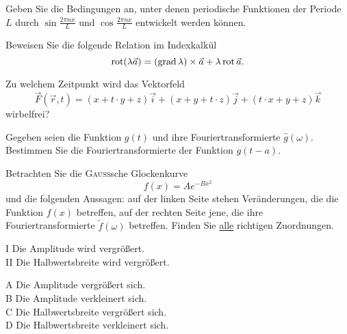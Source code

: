 \documentclass{atistandalonetask}
\begin{document}
\begin{atiTask}[
	title = Weitere Fragen
]
	\providecommand{\D}{\mathrm{d}}

\begin{atiSubtasks}
	\item Geben Sie die Bedingungen an, unter denen periodische Funktionen der Periode $L$ durch $\sin \frac{2\pi n x}{L}$ und $\cos \frac{2\pi nx}{L}$ entwickelt werden können.
	\item Beweisen Sie die folgende Relation im Indexkalkül
	\[\operatorname{rot}(\lambda\vec{a})=(\operatorname{grad}\lambda) \times\vec{a}+\lambda\operatorname{rot}\vec{a}.
	\]
	\item Zu welchem Zeitpunkt wird das Vektorfeld 
	\[
	\vec{F}(\vec{r},t)=(x+t\cdot y+z)\vec{i}+(x+y+t\cdot z)\vec{j}+(t\cdot x+y+z)\vec{k}
	\]
	wirbelfrei?
	\item Gegeben seien die Funktion $g(t)$ und ihre Fouriertransformierte $\hat{g}(\omega)$. Bestimmen Sie die Fouriertransformierte der Funktion $g(t-a)$.
	\item Betrachten Sie die \textsc{Gauss}sche Glockenkurve
	\[
	f(x)=Ae^{-Bx^2}
	\]
	und die folgenden Aussagen: auf der linken Seite stehen Veränderungen, die die Funktion $f(x)$ betreffen, auf der rechten Seite jene, die ihre Fouriertransformierte $\tilde{f}(\omega)$ betreffen. Finden Sie \underline{alle} richtigen Zuordnungen.\\
	
	\begin{minipage}{6cm}
	I Die Amplitude wird vergrößert.\\
	II Die Halbwertsbreite wird vergrößert.
	\end{minipage}
	\begin{minipage}{6cm}
	A Die Amplitude vergrößert sich.\\
	B Die Amplitude verkleinert sich.\\
	C Die Halbwertsbreite vergrößert sich.\\
	D Die Halbwertsbreite verkleinert sich.
	\end{minipage}\\
		
	
\end{atiSubtasks}


\end{atiTask}
\end{document}
